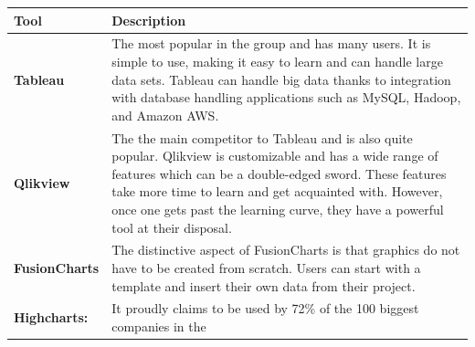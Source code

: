 \documentclass[]{book}
\theoremstyle{definition}
\theoremstyle{definition}
\theoremstyle{definition}
\theoremstyle{remark}
\begin{document}
\begin{longtable}[]{@{}ll@{}}
\toprule
\begin{minipage}[b]{0.16\columnwidth}\raggedright\strut
\textbf{Tool}\strut
\end{minipage} & \begin{minipage}[b]{0.78\columnwidth}\raggedright\strut
\textbf{Description}\strut
\end{minipage}\tabularnewline
\midrule
\endhead
\begin{minipage}[t]{0.16\columnwidth}\raggedright\strut
\textbf{Tableau}\strut
\end{minipage} & \begin{minipage}[t]{0.78\columnwidth}\raggedright\strut
The most popular in the group and has many users. It is simple to use,
making it easy to learn and can handle large data sets. Tableau can
handle big data thanks to integration with database handling
applications such as MySQL, Hadoop, and Amazon AWS.\strut
\end{minipage}\tabularnewline
\begin{minipage}[t]{0.16\columnwidth}\raggedright\strut
\textbf{Qlikview}\strut
\end{minipage} & \begin{minipage}[t]{0.78\columnwidth}\raggedright\strut
The the main competitor to Tableau and is also quite popular. Qlikview
is customizable and has a wide range of features which can be a
double-edged sword. These features take more time to learn and get
acquainted with. However, once one gets past the learning curve, they
have a powerful tool at their disposal.\strut
\end{minipage}\tabularnewline
\begin{minipage}[t]{0.16\columnwidth}\raggedright\strut
\textbf{FusionCharts}\strut
\end{minipage} & \begin{minipage}[t]{0.78\columnwidth}\raggedright\strut
The distinctive aspect of FusionCharts is that graphics do not have to
be created from scratch. Users can start with a template and insert
their own data from their project.\strut
\end{minipage}\tabularnewline
\begin{minipage}[t]{0.16\columnwidth}\raggedright\strut
\textbf{Highcharts:}\strut
\end{minipage} & \begin{minipage}[t]{0.78\columnwidth}\raggedright\strut
It proudly claims to be used by 72\% of the 100 biggest companies in the

\end{minipage}
\end{longtable}
\end{document}

